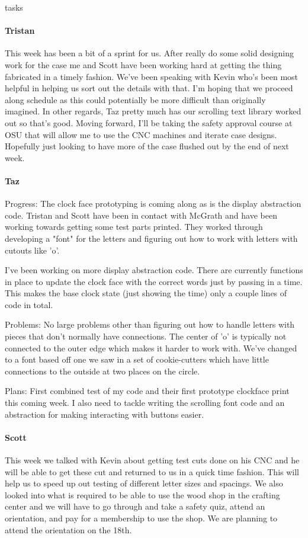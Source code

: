 tasks\documentclass[onecolumn, draftclsnofoot,10pt, compsoc]{IEEEtran}
\begin{document}
\paragraph{Tristan}
This week has been a bit of a sprint for us. After really do some solid designing work for the case me and Scott have been working hard at getting the thing fabricated in a timely fashion. We've been speaking with Kevin who's been most helpful in helping us sort out the details with that. I'm hoping that we proceed along schedule as this could potentially be more difficult than originally imagined. In other regards, Taz pretty much has our scrolling text library worked out so that's good. Moving forward, I'll be taking the safety approval course at OSU that will allow me to use the CNC machines and iterate case designs. Hopefully just looking to have more of the case flushed out by the end of next week.
\paragraph{Taz}
Progress: The clock face prototyping is coming along as is the display abstraction code. Tristan and Scott have been in contact with McGrath and have been working towards getting some test parts printed. They worked through developing a "font" for the letters and figuring out how to work with letters with cutouts like 'o'.

I've been working on more display abstraction code. There are currently functions in place to update the clock face with the correct words just by passing in a time. This makes the base clock state (just showing the time) only a couple lines of code in total.

Problems: No large problems other than figuring out how to handle letters with pieces that don't normally have connections. The center of 'o' is typically not connected to the outer edge which makes it harder to work with. We've changed to a font based off one we saw in a set of cookie-cutters which have little connections to the outside at two places on the circle.

Plans: First combined test of my code and their first prototype clockface print this coming week. I also need to tackle writing the scrolling font code and an abstraction for making interacting with buttons easier.
\paragraph{Scott}
This week we talked with Kevin about getting test cuts done on his CNC and he will be able to get these cut and returned to us in a quick time fashion. This will help us to speed up out testing of different letter sizes and spacings. We also looked into what is required to be able to use the wood shop in the crafting center and we will have to go through and take a safety quiz, attend an orientation, and pay for a membership to use the shop. We are planning to attend the orientation on the 18th.
\end{document}
